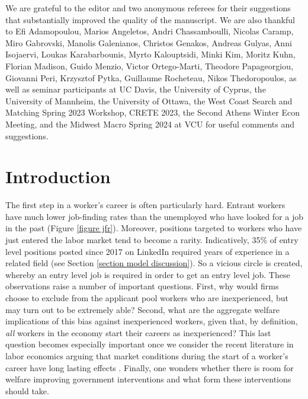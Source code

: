 \documentclass[12pt]{article} %
\theoremstyle{definition}
\begin{document}
\noindent We are grateful to the editor and two anonymous referees for their suggestions that substantially improved the quality of the manuscript. We are also thankful to Efi Adamopoulou, Marios Angeletos, Andri Chassamboulli, Nicolas Caramp, Miro Gabrovski, Manolis Galenianos, Christos Genakos, Andreas Gulyas, Anni Isojaervi, Loukas Karabarbounis, Myrto Kalouptsidi, Minki Kim, Moritz Kuhn, Florian Madison, Guido Menzio, Victor Ortego-Marti, Theodore Papageorgiou, Giovanni Peri, Krzysztof Pytka, Guillaume Rocheteau, Nikos Thedoropoulos, as well as seminar participants at UC Davis, the University of Cyprus, the University of Mannheim, the University of Ottawa, the West Coast Search and Matching Spring 2023 Workshop, CRETE 2023, the Second Athens Winter Econ Meeting, and the Midwest Macro Spring 2024 at VCU for useful comments and suggestions.



\newpage
\setcounter{page}{1}
\normalsize

\section{Introduction}\label{section intro} 

The first step in a worker's career is often particularly hard. Entrant workers have much lower job-finding rates than the unemployed who have looked for a job in the past (Figure \ref{figure jfr}).
Moreover, positions targeted to workers who have just entered the labor market tend to become a rarity. Indicatively, 35\% of entry level positions posted since 2017 on LinkedIn required years of experience in a related field (see Section \ref{section model discussion}). So a vicious circle is created, whereby an entry level job is required in order to get an entry level job. These observations raise a number of important questions. First, why would firms choose to exclude from the applicant pool workers who are inexperienced, but may turn out to be extremely able? Second, what are the aggregate welfare implications of this bias against inexperienced workers, given that, by definition, \textit{all} workers in the economy start their careers as inexperienced? This last question becomes especially important once we consider the recent literature in labor economics arguing that market conditions during the start of a worker's career have long lasting effects \citep{wachter2020persistent}. Finally, one wonders whether there is room for welfare improving government interventions and what form these interventions should take.  
\end{document}
